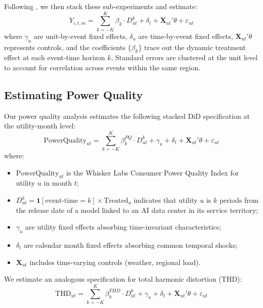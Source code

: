 \documentclass[a4paper,fleqn,longmktitle]{cas-sc}
\begin{document}
Following \cite{wing2024stacked}, we then stack these sub-experiments and estimate:
\begin{equation}
Y_{i,t,m} = \sum_{k=-K}^{K} \beta_k \cdot D_{ut}^k  + \delta_t + \mathbf{X}_{ut}'\theta + \varepsilon_{ut}
\label{eq:stacked}
\end{equation}
where $\gamma_{u}$ are unit-by-event fixed effects, $\delta_{u}$ are time-by-event fixed effects, $\mathbf{X}_{ut}'\theta$ represents controls, and the coefficients $\{\beta_k\}$ trace out the dynamic treatment effect at each event-time horizon $k$. Standard errors are clustered at the unit level to account for correlation across events within the same region.


\subsection{Estimating Power Quality}

Our power quality analysis estimates the following stacked DiD specification at the utility-month level:
\begin{equation}
\text{PowerQuality}_{ut} = \sum_{k=-K}^{K} \beta_k^{PQ} \cdot D_{ut}^k + \gamma_u + \delta_t + \mathbf{X}_{ut}'\theta + \varepsilon_{ut}
\label{eq:pq_eventstudy}
\end{equation}
where:
\begin{itemize}
    \item $\text{PowerQuality}_{ut}$ is the Whisker Labs Consumer Power Quality Index for utility $u$ in month $t$;
    \item $D_{ut}^k = \mathbf{1}[\text{event-time} = k] \times \text{Treated}_u$ indicates that utility $u$ is $k$ periods from the release date of a model linked to an AI data center in its service territory;
    \item $\gamma_u$ are utility fixed effects absorbing time-invariant characteristics;
    \item $\delta_t$ are calendar month fixed effects absorbing common temporal shocks;
    \item $\mathbf{X}_{ut}$ includes time-varying controls (weather, regional load).
\end{itemize}

We estimate an analogous specification for total harmonic distortion (THD):
\begin{equation}
\text{THD}_{ut} = \sum_{k=-K}^{K} \beta_k^{THD} \cdot D_{ut}^k + \gamma_u + \delta_t + \mathbf{X}_{ut}'\theta + \varepsilon_{ut}
\label{eq:thd_eventstudy}
\end{equation}
\end{document}
